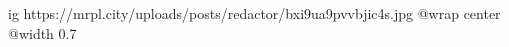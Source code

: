  
 
 
 
 

\ifcmt
  ig https://mrpl.city/uploads/posts/redactor/bxi9ua9pvvbjic4s.jpg
  @wrap center
  @width 0.7
\fi
